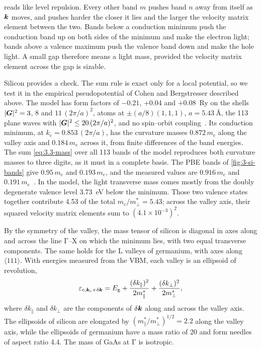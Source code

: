  reads like level repulsion. Every other band $m$ pushes band $n$ away from itself as $\bm{k}$ moves, and pushes harder the closer it lies and the larger the velocity matrix element between the two. Bands below a conduction minimum push the conduction band up on both sides of the minimum and make the electron light; bands above a valence maximum push the valence band down and make the hole light. A small gap therefore means a light mass, provided the velocity matrix element across the gap is sizable.

Silicon provides a check. The sum rule is exact only for a local potential, so we test it in the empirical pseudopotential of Cohen and Bergstresser described above. The model has form factors of $-0.21$, $+0.04$ and $+0.08$~Ry on the shells $|\bm{G}|^2 = 3$, 8 and $11\,(2\pi/a)^2$, atoms at $\pm(a/8)(1,1,1)$, $a = \SI{5.43}{\angstrom}$, the 113 plane waves with $|\bm{G}|^2 \le 20\,(2\pi/a)^2$, and no spin--orbit coupling~\cite{cohen1966band}. Its conduction minimum, at $k_{\mathrm{c}} = 0.853\,(2\pi/a)$, has the curvature masses $0.872\,m_e$ along the valley axis and $0.184\,m_e$ across it, from finite differences of the band energies. The sum \cref{eq:3.3-mass} over all 113 bands of the model reproduces both curvature masses to three digits, as it must in a complete basis. The PBE bands of \cref{fig:3-si-bands} give $0.95\,m_e$ and $0.193\,m_e$, and the measured values are $0.916\,m_e$ and $0.191\,m_e$~\cite{hensel1965cyclotron}. In the model, the light transverse mass comes mostly from the doubly degenerate valence level \SI{3.73}{eV} below the minimum. Those two valence states together contribute 4.53 of the total $m_e/m^*_\perp = 5.43$; across the valley axis, their squared velocity matrix elements sum to $(4.1\times10^{-3})^2$.

By the symmetry of the valley, the mass tensor of silicon is diagonal in axes along and across the line $\mathrm{\Gamma}$--$\mathrm{X}$ on which the minimum lies, with two equal transverse components. The same holds for the $\mathrm{L}$ valleys of germanium, with axes along $\langle111\rangle$. With energies measured from the VBM, each valley is an ellipsoid of revolution,
\begin{equation}
  \varepsilon_{c,\bm{k}_{\mathrm{c}}+\delta\bm{k}} = E_{\mathrm{g}} + \frac{(\delta k_\parallel)^2}{2m^*_\parallel} + \frac{(\delta k_\perp)^2}{2m^*_\perp} ,
  \label{eq:3.3-valley}
\end{equation}
where $\delta k_\parallel$ and $\delta k_\perp$ are the components of $\delta\bm{k}$ along and across the valley axis. The ellipsoids of silicon are elongated by $(m^*_\parallel/m^*_\perp)^{1/2} = 2.2$ along the valley axis, while the ellipsoids of germanium have a mass ratio of 20 and form needles of aspect ratio 4.4. The mass of GaAs at $\mathrm{\Gamma}$ is isotropic.

